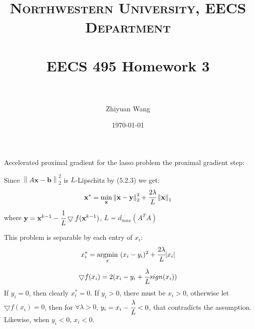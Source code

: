 \documentclass[paper=a4, fontsize=11pt]{scrartcl} %
\title{	
\normalfont \normalsize 
\textsc{Northwestern University, EECS Department} \\ [25pt] %
\horrule{0.5pt} \\[0.4cm] %
\huge EECS 495 Homework 3 \\ %
\horrule{2pt} \\[0.5cm] %
}
\author{Zhiyuan Wang} %
\date{\normalsize\today} %
\makeatletter
\numberwithin{equation}{section} %
\numberwithin{figure}{section} %
\numberwithin{table}{section} %
\renewcommand{\section}{\@startsection{section}{1}{0mm}
  {-\baselineskip}{0.5 \baselineskip}{\bf\leftline}}
\newcommand{\norm}[1]{\left\lVert #1 \right\rVert}
\newcommand{\argmin}{\operatornamewithlimits{argmin}}
\makeatother
\begin{document}
\setlength{\parindent}{2em}
\maketitle %


\section{Accelerated proximal gradient for the lasso problem}
the proximal gradient step:

Since $\norm{A\mathbf{x}-\mathbf{b}}_2^2$ is $L$-Lipschitz by (5.2.3) we get:
\begin{equation}
\mathbf{x}^* = \min_\mathbf{x} \norm{\mathbf{x}-\mathbf{y}}_2^2+\cfrac{2\lambda}{L}\norm{\mathbf{x}}_1
\end{equation}
where $\mathbf{y}=\mathbf{x}^{k-1}-\cfrac{1}{L} \bigtriangledown f(\mathbf{x}^{k-1})$, $L = d_{max}(A^TA)$

This problem is separable by each entry of $x_i$:
\begin{equation}
x_i^* = \argmin_x\ (x_i - y_i)^2+\cfrac{2\lambda}{L}|x_i|
\end{equation}
\begin{equation}
\bigtriangledown f(x_i) = 2(x_i-y_i+\cfrac{\lambda}{L}sign(x_i))
\end{equation}
If $y_i=0$, then clearly $x_i^*=0$. If $y_i>0$, there must be $x_i>0$, otherwise let $\bigtriangledown f(x_i) = 0$, then for $\forall \lambda>0$, $y_i=x_i-\cfrac{\lambda}{L}< 0$, that contradicts the assumption. Likewise, when $y_i<0$, $x_i<0$.
\end{document}
